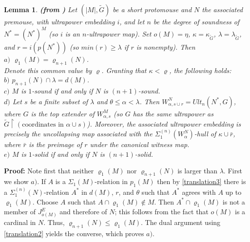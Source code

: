 \documentclass[12pt]{article}
\newtheorem{lem}[thm]{Lemma}
\begin{document}
\begin{lem} \label{short finestructure computation}
\textbf{(from \cite{zeman square proof})}
Let $(|M| , \tilde{G})$ be a short protomouse and $N$ the associated premouse, with ultrapower embedding $i$, and let $n$ be the degree of soundness of $N^* = (N^*)^M$ (so $i$ is an $n$-ultrapower map).  Set $o(M) = \eta$, $\kappa = \kappa_{\tilde{G}}$, $\lambda = \lambda_{\tilde{G}}$, and $r = i(p(N^*))$ (so $min(r) \geq \lambda$ if $r$ is nonempty).  Then\\

$a)$ $\varrho_1 (M) = \varrho_{n+1} (N)$.\\

Denote this common value by $\varrho$.  Granting that $\kappa < \varrho$, the following holds:\\

$b)$ $p_{n+1} (N) \cap \lambda = d(M)$.\\

$c)$ $M$ is $1$-sound if and only if $N$ is $(n+1)$-sound.\\

$d)$ Let $s$ be a finite subset of $\lambda$ and $\theta \leq \alpha < \lambda$.  Then $W_{\alpha , s \cup r}^N = Ult_n (N^* , G )$, where $G$ is the top extender of $W_{\alpha , s}^M$ (so $G$ has the same ultrapower as $\tilde{G} \restriction ( \text{coordinates in } \alpha \cup s)$).  Moreover, the associated ultrapower embedding is precisely the uncollapsing map associated with the $\Sigma_1^{(n)} ( W_\alpha^N )$-hull of $\kappa \cup  \bar{r}$, where $\bar{r}$ is the preimage of $r$ under the canonical witness map.\\

$e)$ $M$ is $1$-solid if and only if $N$ is $(n+1 )$-solid.
\end{lem}

\textbf{Proof:}  Note first that neither $\varrho_1 (M)$ nor $\varrho_{n+1} (N)$ is larger than $\lambda$.  First we show $a)$.  If $A$ is a $\Sigma_1 (M)$-relation in $p_1 (M)$ then by \ref{translation3} there is a $\Sigma_1^{(n)} (N)$-relation $A^*$ in $d (M)$, $r$, and $\theta$ such that $A^*$ agrees with $A$ up to $\varrho_1 (M)$.  Choose $A$ such that $A \cap \varrho_1 (M) \notin M$.  Then $A^* \cap \varrho_1 (M)$ is not a member of $J_{o(M)}^E$ and therefore of $N$; this follows from the fact that $o(M)$ is a cardinal in $N$.  Thus, $\varrho_{n+1}(N) \leq \varrho_1 (M)$.  The dual argument using \ref{translation2} yields the converse, which proves $a)$.\\
\end{document}
